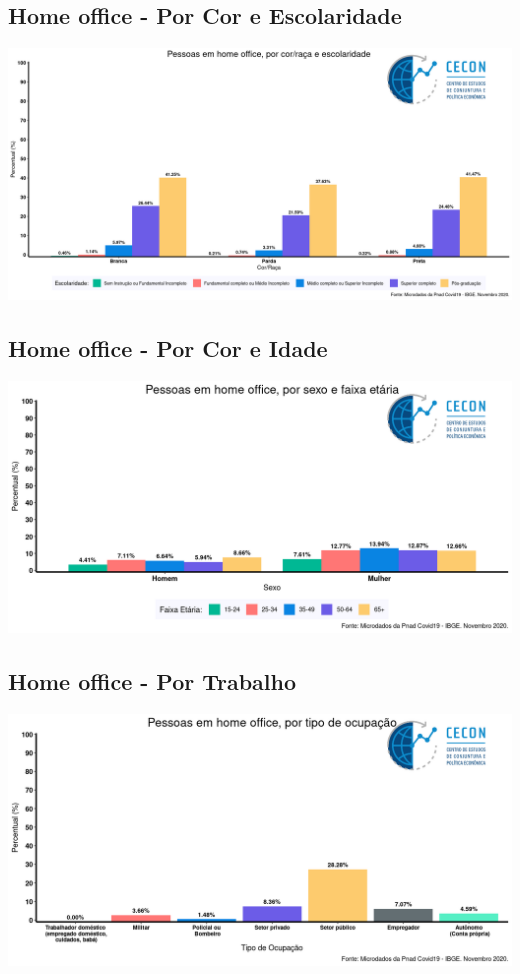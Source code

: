 \documentclass{SelfArx}
\begin{document}
\subsection*{Home office - Por Cor e Escolaridade}
\label{sec:org7805f86}
\begin{center}
\includegraphics[width=.9\linewidth]{./figs/PNAD_COVID/home_edu_cor.png}
\end{center}
\subsection*{Home office - Por Cor e Idade}
\label{sec:org3dfe478}
\begin{center}
\includegraphics[width=.9\linewidth]{./figs/PNAD_COVID/home_sexo_idade.png}
\end{center}

\subsection*{Home office - Por Trabalho}
\label{sec:org1222724}
\begin{center}
\includegraphics[width=.9\linewidth]{./figs/PNAD_COVID/home_emprego.png}
\end{center}
\end{document}
